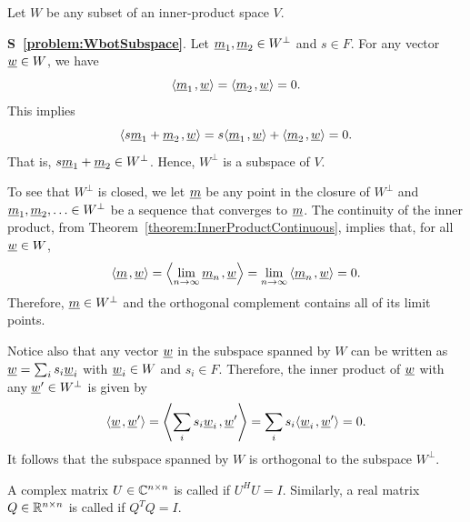 \begin{problem} \label{problem:WbotSubspace}
Let $W$ be any subset of an inner-product space $V$.
\end{problem}
\noindent
\textbf{S~\ref{problem:WbotSubspace}}.
Let $\underline{m}_1, \underline{m}_2 \in W^{\bot}$ and $s \in F$.
For any vector $\underline{w} \in W$, we have
\begin{equation*}
{\left\langle  \underline{m}_1  \mskip2mu ,  \underline{w}  \right\rangle}
= {\left\langle  \underline{m}_2  \mskip2mu ,  \underline{w}  \right\rangle}
= 0.
\end{equation*}
This implies
\begin{equation*}
{\left\langle  s \underline{m}_1 + \underline{m}_2  \mskip2mu ,  \underline{w}  \right\rangle}
= s {\left\langle  \underline{m}_1  \mskip2mu ,  \underline{w}  \right\rangle}
+ {\left\langle  \underline{m}_2  \mskip2mu ,  \underline{w}  \right\rangle}
= 0.
\end{equation*}
That is, $s \underline{m}_1 + \underline{m}_2 \in W^{\bot}$.
Hence, $W^{\bot}$ is a subspace of $V$.

To see that $W^{\bot}$ is closed, we let $\underline{m}$ be any point in the closure of $W^{\bot}$ and $\underline{m}_1,\underline{m}_2,\ldots \in W^{\bot}$ be a sequence that converges to $\underline{m}$.
The continuity of the inner product, from Theorem~\ref{theorem:InnerProductContinuous}, implies that, for all $\underline{w}\in W$,
\[ {\left\langle  \underline{m}  \mskip2mu ,  \underline{w}  \right\rangle} =  {\left\langle  \lim_{n\rightarrow\infty} \underline{m}_n  \mskip2mu ,  \underline{w}   \right\rangle}  =  \lim_{n\rightarrow\infty}  {\left\langle  \underline{m}_n  \mskip2mu ,  \underline{w}   \right\rangle} = 0. \]
Therefore, $\underline{m} \in W^{\bot}$ and the orthogonal complement contains all of its limit points.

Notice also that any vector $\underline{w}$ in the subspace spanned by $W$ can be written as $\underline{w} = \sum_{i} s_i \underline{w}_i$ with $\underline{w}_i \in W$ and $s_i \in F$.
Therefore, the inner product of $\underline{w}$ with any $\underline{w}' \in W^{\bot}$ is given by
\begin{equation*}
{\left\langle  \underline{w}  \mskip2mu ,  \underline{w}'  \right\rangle}
= {\left\langle  \sum_{i} s_i \underline{w}_i  \mskip2mu ,  \underline{w}'  \right\rangle} \\
= \sum_{i} s_i {\left\langle  \underline{w}_i  \mskip2mu ,  \underline{w}'  \right\rangle} \\
= 0.
\end{equation*}
It follows that the subspace spanned by $W$ is orthogonal to the subspace $W^{\bot}$.

\begin{definition}
A complex matrix $U\in \mathbb{C}^{n\times n}$ is called  if $U^H U = I$.
Similarly, a real matrix $Q\in \mathbb{R}^{n\times n}$ is called  if $Q^T Q = I$.
\end{definition}

